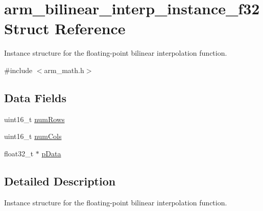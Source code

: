 \hypertarget{structarm__bilinear__interp__instance__f32}{\section{arm\-\_\-bilinear\-\_\-interp\-\_\-instance\-\_\-f32 Struct Reference}
\label{structarm__bilinear__interp__instance__f32}
}


Instance structure for the floating-\/point bilinear interpolation function.  




{\ttfamily \#include $<$arm\-\_\-math.\-h$>$}

\subsection*{Data Fields}
\begin{DoxyCompactItemize}
\item 
uint16\-\_\-t \hyperlink{structarm__bilinear__interp__instance__f32_a1bcf80ccdc2acc29198f1592ae300390}{num\-Rows}
\item 
uint16\-\_\-t \hyperlink{structarm__bilinear__interp__instance__f32_a4bb5ec0d13eb4c9cf887aa8366a44117}{num\-Cols}
\item 
float32\-\_\-t $\ast$ \hyperlink{structarm__bilinear__interp__instance__f32_af5c3a2f15c98850cdcfbe6f87e5ac5df}{p\-Data}
\end{DoxyCompactItemize}


\subsection{Detailed Description}
Instance structure for the floating-\/point bilinear interpolation function. 

